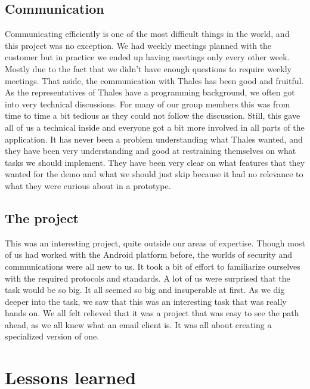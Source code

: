 \subsection{Communication}
Communicating efficiently is one of the most difficult things in the world, and this project was no exception. We had weekly meetings planned with the customer but in practice we ended up having meetings only every other week. Mostly due to the fact that we didn’t have enough questions to require weekly meetings.
\newline
\newline
That aside, the communication with Thales has been good and fruitful. As the representatives of Thales have a programming background, we often got into very technical discussions. For many of our group members this was from time to time a bit tedious as they could not follow the discussion. Still, this gave all of us a technical inside and everyone got a bit more involved in all parts of the application. It has never been a problem understanding what Thales wanted, and they have been very understanding and good at restraining themselves on what tasks we should implement. They have been very clear on what features that they wanted for the demo and what we should just skip because it had no relevance to what they were curious about in a prototype.
\subsection{The project}
This was an interesting project, quite outside our areas of expertise. Though most of us had worked with the Android platform before, the worlds of security and communications were all new to us. It took a bit of effort to familiarize ourselves with the required protocols and standards.
\newpage
A lot of us were surprised that the task would be so big. It all seemed so big and insuperable at first. As we dig deeper into the task, we saw that this was an interesting task that was really hands on. We all felt relieved that it was a project that was easy to see the path ahead, as we all knew what an email client is. It was all about creating a specialized version of one. 

\section{Lessons learned}
